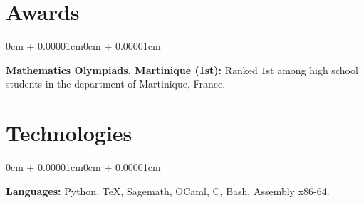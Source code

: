 \documentclass[10pt, letterpaper]{article}
\newenvironment{onecolentry}{
    \begin{adjustwidth}{0cm + 0.00001cm}{0cm + 0.00001cm}
}{
    \end{adjustwidth}
}
\begin{document}
\vspace{0.2cm}

\section{Awards}

\begin{onecolentry}
    \textbf{Mathematics Olympiads, Martinique (1st):} Ranked $1$st among high school students in the department of Martinique, France.
\end{onecolentry}

\section{Technologies}

\begin{onecolentry}
    \textbf{Languages:} Python, \TeX, Sagemath, OCaml, C, Bash, Assembly x86-64.
\end{onecolentry}
\end{document}
